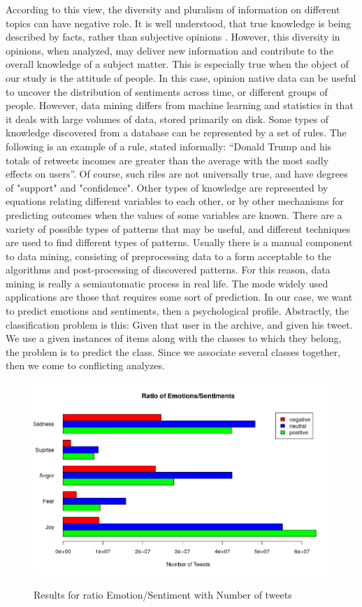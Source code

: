 \documentclass{acmtog} %
\begin{document}
According to this view, the diversity and pluralism of information on different topics can have negative role. It is well understood, that true knowledge is being described by facts, rather than subjective opinions \cite{ThakkarP15}. However, this diversity in opinions, when analyzed, may deliver new information and contribute to the overall knowledge of a subject matter. This is especially true when the object of our study is the attitude of people. In this case, opinion native data can be useful to uncover the distribution of sentiments across time, or different groups of people. However, data mining differs from machine learning and statistics in that it deals with large volumes of data, stored primarily on disk. Some types of knowledge discovered from a database can be represented by a set of rules. The following is an example of a rule, stated informally: “Donald Trump and his totals of retweets incomes are greater than the average with the most sadly effects on users”. Of course, such riles are not universally true, and have degrees of "support" and "confidence". Other types of knowledge are represented by equations relating different variables to each other, or by other mechanisms for predicting outcomes when the values of some variables are known. There are a variety of possible types of patterns that may be useful, and different techniques are used to find different types of patterns. Usually there is a manual component to data mining, consisting of preprocessing data to a form acceptable to the algorithms and post-processing of discovered patterns. For this reason, data mining is really a semiautomatic process in real life. The mode widely used applications are those that requires some sort of prediction. In our case, we want to predict emotions and sentiments, then a psychological profile. Abstractly, the classification problem is this: Given that user in the archive, and given his tweet. We use a given instances of items along with the classes to which they belong, the problem is to predict the class. Since we associate several classes together, then we come to conflicting analyzes. 

\begin{figure}[h!]
{\includegraphics[width=\linewidth]{final_plot_contradiction_analysis.png}}
\caption{Results for ratio Emotion/Sentiment with Number of tweets}
  \label{fig:contradiction_barplot}
\end{figure}
\end{document}
